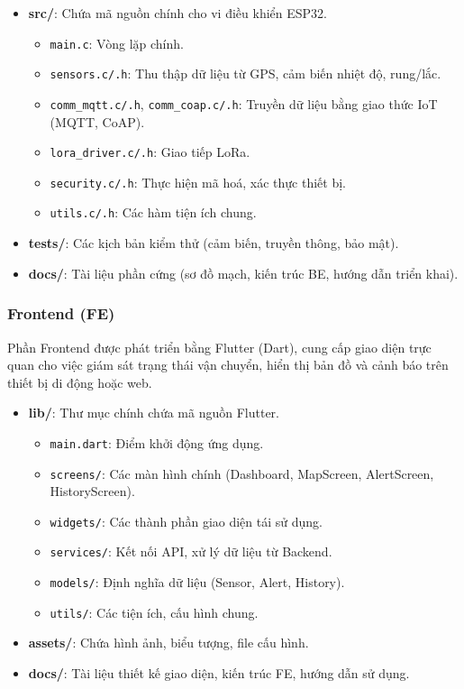 \begin{itemize}
    \item \textbf{src/}: Chứa mã nguồn chính cho vi điều khiển ESP32.
    \begin{itemize}
        \item \texttt{main.c}: Vòng lặp chính.
        \item \texttt{sensors.c/.h}: Thu thập dữ liệu từ GPS, cảm biến nhiệt độ, rung/lắc.
        \item \texttt{comm\_mqtt.c/.h}, \texttt{comm\_coap.c/.h}: Truyền dữ liệu bằng giao thức IoT (MQTT, CoAP).
        \item \texttt{lora\_driver.c/.h}: Giao tiếp LoRa.
        \item \texttt{security.c/.h}: Thực hiện mã hoá, xác thực thiết bị.
        \item \texttt{utils.c/.h}: Các hàm tiện ích chung.
    \end{itemize}
    \item \textbf{tests/}: Các kịch bản kiểm thử (cảm biến, truyền thông, bảo mật).
    \item \textbf{docs/}: Tài liệu phần cứng (sơ đồ mạch, kiến trúc BE, hướng dẫn triển khai).
\end{itemize}

\subsubsection*{Frontend (FE)}
Phần Frontend được phát triển bằng Flutter (Dart), cung cấp giao diện trực quan cho việc giám sát trạng thái vận chuyển, hiển thị bản đồ và cảnh báo trên thiết bị di động hoặc web.

\begin{itemize}
    \item \textbf{lib/}: Thư mục chính chứa mã nguồn Flutter.
    \begin{itemize}
        \item \texttt{main.dart}: Điểm khởi động ứng dụng.
        \item \texttt{screens/}: Các màn hình chính (Dashboard, MapScreen, AlertScreen, HistoryScreen).
        \item \texttt{widgets/}: Các thành phần giao diện tái sử dụng.
        \item \texttt{services/}: Kết nối API, xử lý dữ liệu từ Backend.
        \item \texttt{models/}: Định nghĩa dữ liệu (Sensor, Alert, History).
        \item \texttt{utils/}: Các tiện ích, cấu hình chung.
    \end{itemize}
    \item \textbf{assets/}: Chứa hình ảnh, biểu tượng, file cấu hình.
    \item \textbf{docs/}: Tài liệu thiết kế giao diện, kiến trúc FE, hướng dẫn sử dụng.
\end{itemize}

